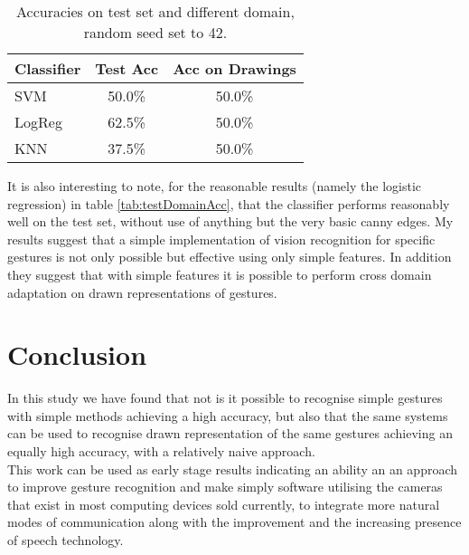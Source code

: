 \documentclass[11pt, a4paper]{article}
\begin{document}
\begin{table}[h]
  \centering
    \begin{tabular}{l|cc}
    Classifier & Test Acc & Acc on Drawings \\\hline
    SVM        & 50.0\%   & 50.0\%          \\
    LogReg     & 62.5\%   & 50.0\%          \\
    KNN        & 37.5\%   & 50.0\%
    \end{tabular}
  \caption{Accuracies on test set and different domain, random seed set to 42.}
  \label{tab:seedDomainAcc}
\end{table}
It is also interesting to note, for the reasonable results (namely the logistic regression) in table \ref{tab:testDomainAcc}, that the classifier performs reasonably well on the test set, without use of anything but the very basic canny edges. My results suggest that a simple implementation of vision recognition for specific gestures is not only possible but effective using only simple features. In addition they suggest that with simple features it is possible to perform cross domain adaptation on drawn representations of gestures. 
\section{Conclusion}
In this study we have found that not is it possible to recognise simple gestures with simple methods achieving a high accuracy, but also that the same systems can be used to recognise drawn representation of the same gestures achieving an equally high accuracy, with a relatively naive approach.\\
This work can be used as early stage results indicating an ability an an approach to improve gesture recognition and make simply software utilising the cameras that exist in most computing devices sold currently, to integrate more natural modes of communication along with the improvement and the increasing presence of speech technology.
\end{document}
